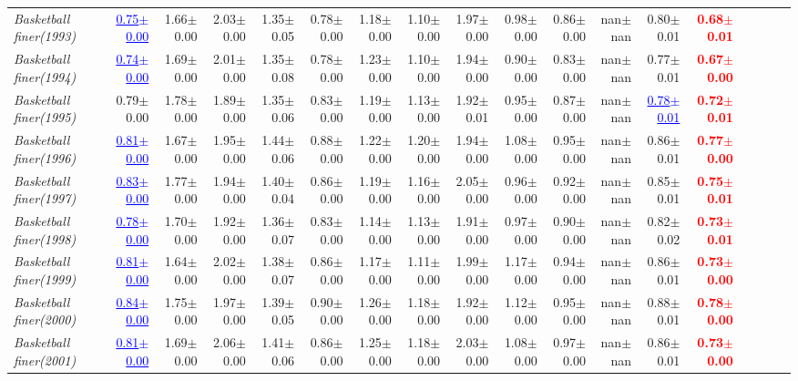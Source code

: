 \documentclass[nohyperref]{article}
\theoremstyle{plain}
\theoremstyle{definition}
\theoremstyle{remark}
\newcommand{\red}[1]{\textcolor{red}{\textbf{#1}}}
\newcommand{\blue}[1]{\textcolor{blue}{\underline{#1}}}
\begin{document}
\begin{table*}[!ht]
{\begin{tabular}{lrrrrrrrrrrrrrrrrr}
			{\it Basketball finer(1993)} & \blue{0.75$\pm$0.00} & 1.66$\pm$0.00 & 2.03$\pm$0.00 & 1.35$\pm$0.05 & 0.78$\pm$0.00 & 1.18$\pm$0.00 & 1.10$\pm$0.00 & 1.97$\pm$0.00 & 0.98$\pm$0.00 & 0.86$\pm$0.00 & nan$\pm$nan & 0.80$\pm$0.01 & \red{0.68$\pm$0.01} \\
			{\it Basketball finer(1994)} & \blue{0.74$\pm$0.00} & 1.69$\pm$0.00 & 2.01$\pm$0.00 & 1.35$\pm$0.08 & 0.78$\pm$0.00 & 1.23$\pm$0.00 & 1.10$\pm$0.00 & 1.94$\pm$0.00 & 0.90$\pm$0.00 & 0.83$\pm$0.00 & nan$\pm$nan & 0.77$\pm$0.01 & \red{0.67$\pm$0.00} \\
			{\it Basketball finer(1995)} & 0.79$\pm$0.00 & 1.78$\pm$0.00 & 1.89$\pm$0.00 & 1.35$\pm$0.06 & 0.83$\pm$0.00 & 1.19$\pm$0.00 & 1.13$\pm$0.00 & 1.92$\pm$0.01 & 0.95$\pm$0.00 & 0.87$\pm$0.00 & nan$\pm$nan & \blue{0.78$\pm$0.01} & \red{0.72$\pm$0.01} \\
			{\it Basketball finer(1996)} & \blue{0.81$\pm$0.00} & 1.67$\pm$0.00 & 1.95$\pm$0.00 & 1.44$\pm$0.06 & 0.88$\pm$0.00 & 1.22$\pm$0.00 & 1.20$\pm$0.00 & 1.94$\pm$0.00 & 1.08$\pm$0.00 & 0.95$\pm$0.00 & nan$\pm$nan & 0.86$\pm$0.01 & \red{0.77$\pm$0.00} \\
			{\it Basketball finer(1997)} & \blue{0.83$\pm$0.00} & 1.77$\pm$0.00 & 1.94$\pm$0.00 & 1.40$\pm$0.04 & 0.86$\pm$0.00 & 1.19$\pm$0.00 & 1.16$\pm$0.00 & 2.05$\pm$0.00 & 0.96$\pm$0.00 & 0.92$\pm$0.00 & nan$\pm$nan & 0.85$\pm$0.01 & \red{0.75$\pm$0.01} \\
			{\it Basketball finer(1998)} & \blue{0.78$\pm$0.00} & 1.70$\pm$0.00 & 1.92$\pm$0.00 & 1.36$\pm$0.07 & 0.83$\pm$0.00 & 1.14$\pm$0.00 & 1.13$\pm$0.00 & 1.91$\pm$0.00 & 0.97$\pm$0.00 & 0.90$\pm$0.00 & nan$\pm$nan & 0.82$\pm$0.02 & \red{0.73$\pm$0.01} \\
			{\it Basketball finer(1999)} & \blue{0.81$\pm$0.00} & 1.64$\pm$0.00 & 2.02$\pm$0.00 & 1.38$\pm$0.07 & 0.86$\pm$0.00 & 1.17$\pm$0.00 & 1.11$\pm$0.00 & 1.99$\pm$0.00 & 1.17$\pm$0.00 & 0.94$\pm$0.00 & nan$\pm$nan & 0.86$\pm$0.01 & \red{0.73$\pm$0.00} \\
			{\it Basketball finer(2000)} & \blue{0.84$\pm$0.00} & 1.75$\pm$0.00 & 1.97$\pm$0.00 & 1.39$\pm$0.05 & 0.90$\pm$0.00 & 1.26$\pm$0.00 & 1.18$\pm$0.00 & 1.92$\pm$0.00 & 1.12$\pm$0.00 & 0.95$\pm$0.00 & nan$\pm$nan & 0.88$\pm$0.01 & \red{0.78$\pm$0.00} \\
			{\it Basketball finer(2001)} & \blue{0.81$\pm$0.00} & 1.69$\pm$0.00 & 2.06$\pm$0.00 & 1.41$\pm$0.06 & 0.86$\pm$0.00 & 1.25$\pm$0.00 & 1.18$\pm$0.00 & 2.03$\pm$0.00 & 1.08$\pm$0.00 & 0.97$\pm$0.00 & nan$\pm$nan & 0.86$\pm$0.01 & \red{0.73$\pm$0.00} \\

\end{tabular}}
\end{table*}
\end{document}
